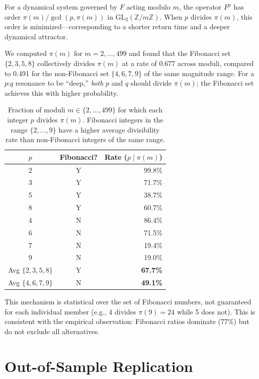 \documentclass[twocolumn,11pt]{article}
\begin{document}
For a dynamical system governed by $F$ acting modulo $m$, the operator
$F^p$ has order $\pi(m) / \gcd(p, \pi(m))$ in $\mathrm{GL}_2(\mathbb{Z}/m\mathbb{Z})$.  When $p$ divides $\pi(m)$, this order is
minimized---corresponding to a shorter return time and a deeper
dynamical attractor.

We computed $\pi(m)$ for $m = 2, \ldots, 499$ and found that the
Fibonacci set $\{2, 3, 5, 8\}$ collectively divides $\pi(m)$ at a
rate of 0.677 across moduli, compared to 0.491 for the non-Fibonacci
set $\{4, 6, 7, 9\}$ of the same magnitude range.  For a $p$:$q$
resonance to be ``deep,'' \emph{both} $p$ and $q$ should divide
$\pi(m)$; the Fibonacci set achieves this with higher probability.

\begin{table}[h]
\centering
\small
\caption{Fraction of moduli $m \in \{2,\ldots,499\}$ for which
each integer $p$ divides $\pi(m)$.  Fibonacci integers in the range
$\{2,\ldots,9\}$ have a higher average divisibility rate than
non-Fibonacci integers of the same range.}
\label{tab:pisano}
\begin{tabular}{ccr}
\toprule
$p$ & Fibonacci? & Rate ($p \mid \pi(m)$) \\
\midrule
2 & Y & 99.8\% \\
3 & Y & 71.7\% \\
5 & Y & 38.7\% \\
8 & Y & 60.7\% \\
\midrule
4 & N & 86.4\% \\
6 & N & 71.5\% \\
7 & N & 19.4\% \\
9 & N & 19.0\% \\
\midrule
Avg $\{2,3,5,8\}$ & Y & \textbf{67.7\%} \\
Avg $\{4,6,7,9\}$ & N & \textbf{49.1\%} \\
\bottomrule
\end{tabular}
\end{table}

This mechanism is statistical over the set of Fibonacci numbers, not
guaranteed for each individual member (e.g., 4 divides $\pi(9) = 24$
while 5 does not).  This is consistent with the empirical observation:
Fibonacci ratios dominate (77\%) but do not exclude all alternatives.

\section{Out-of-Sample Replication}
\label{sec:replication}
\end{document}
